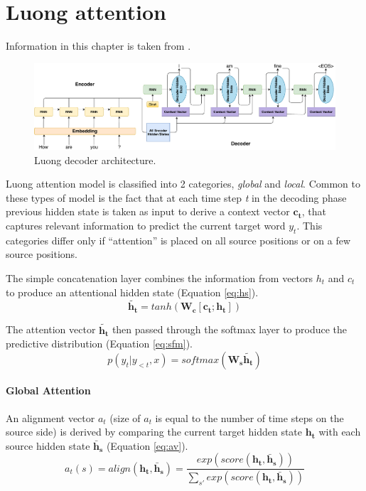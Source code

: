 \chapter{Luong attention} \label{luong_attn_appendix}

Information in this chapter is taken from \cite{luong2015effective}.
\begin{figure}[hbt]
  \centering
  \includegraphics[width=1\textwidth]{figures/luong_decoder.pdf}
  \caption{Luong decoder architecture.}
  \label{luong}
\end{figure}

Luong attention model is classified into 2 categories, \textit{global} and \textit{local}. Common to these types of model is the fact that at each time step \textit{t} in the decoding phase previous hidden state is taken as input to derive a context vector $\mathbf{c_t}$, that captures relevant information to predict the current target word $y_t$. This categories differ only if ``attention'' is placed on all source positions or on a few source positions.

The simple concatenation layer combines the information from vectors $h_t$ and $c_t$ to produce an attentional hidden state (Equation \ref{eq:hs}).
\begin{equation} \label{eq:hs}
\mathbf{\widetilde{h_t}} = tanh(\mathbf{W_c}[\mathbf{c_t};\mathbf{h_t}])
\end{equation}

The attention vector $\mathbf{\widetilde{h_t}}$ then passed through the softmax layer to produce the predictive distribution (Equation \ref{eq:sfm}).
\begin{equation} \label{eq:sfm}
p(y_t|y_{<t},x) = softmax(\mathbf{W_s}\mathbf{\widetilde{h_t}})
\end{equation}

\subsubsection{Global Attention}
An alignment vector $a_t$ (size of $a_t$ is equal to the number of time steps on the source side) is derived by comparing the current target hidden state $\mathbf{h_t}$ with each source hidden state $\mathbf{\bar{h}_s}$ (Equation \ref{eq:av}).
\begin{equation} \label{eq:av}
a_t(s) = align(\mathbf{h_t}, \mathbf{\bar{h}_s}) = \frac{exp(score(\mathbf{h_t}, \mathbf{\bar{h}_s}))}{\sum_{s'} exp(score(\mathbf{h_t}, \mathbf{\bar{h}_s}))}
\end{equation}

